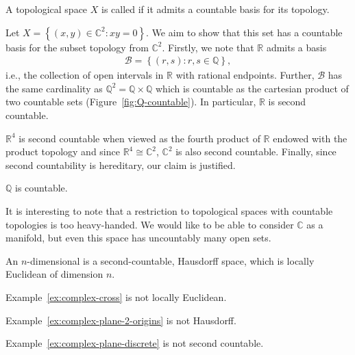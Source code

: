 \begin{definition}
	A topological space $ X $ is called  if it admits a
	countable basis for its topology.
\end{definition}

\begin{example}\label{ex:complex-cross}
	Let $ X = \left\{ (x,y) \in \mathbb{C}^{2}: xy=0 \right\} $. We aim to show that
	this set has a countable basis for the subset topology from $ \mathbb{C}^{2} $.
	Firstly, we note that $ \mathbb{R} $ admits a basis
	\begin{align*}
		\mathcal{B} = \left\{ (r,s) : r,s \in \mathbb{Q} \right\},
	\end{align*}
	i.e., the collection of open intervals in $ \mathbb{R} $ with rational
	endpoints. Further, $ \mathcal{B} $ has the same cardinality as $
		\mathbb{Q}^{2} = \mathbb{Q}\times \mathbb{Q} $ which is countable as the
	cartesian product of two countable sets (Figure~\ref{fig:Q-countable}). In
	particular, $ \mathbb{R} $ is second countable.

	$ \mathbb{R}^{4} $ is second countable when viewed as the fourth
	product of $ \mathbb{R} $ endowed with the product topology and since $
		\mathbb{R}^{4} \cong \mathbb{C}^{2} $, $ \mathbb{C}^{2} $ is also second
	countable. Finally, since second countability is hereditary, our claim is
	justified.
\end{example}

\begin{marginfigure}[-15\baselineskip]
	\centering
	\caption{$ \mathbb{Q} $ is countable.}
	\label{fig:Q-countable}
\end{marginfigure}

It is interesting to note that a restriction to topological spaces with
countable topologies is too heavy-handed. We would like to be able to consider
$ \mathbb{C} $ as a manifold, but even this space has uncountably many open
sets.

\begin{definition}
	An $ n $-dimensional  is a second-countable,
	Hausdorff space, which is locally Euclidean of dimension $ n $.
\end{definition}

\begin{nonexample}
	Example~\ref{ex:complex-cross} is not locally Euclidean.

	Example~\ref{ex:complex-plane-2-origins} is not Hausdorff.

	Example~\ref{ex:complex-plane-discrete} is not second countable.
\end{nonexample}

